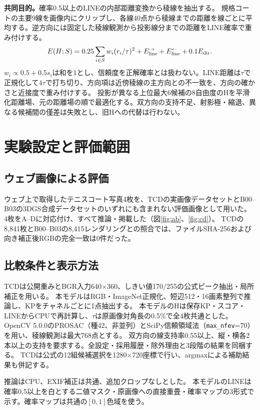 \documentclass[a4paper,10pt]{article}
\newcommand{\sect}[1]{\section{#1}\vspace{-1mm}}
\begin{document}
\textbf{共同目的。}確率0.5以上のLINEの内部距離変換から稜線を抽出する。
規格コートの主要9線を画像内にクリップし、各線40点から稜線までの距離を線ごとに平均する。逆方向には固定した稜線観測から投影線分までの距離をLINE確率で重み付けする。
\begin{equation}
E(H;S)=0.25\sum_{i\in S}w_i(r_i/\tau)^2+E_{\rm line}^{\rightarrow}+E_{\rm line}^{\leftarrow}+0.1E_{\rm dir}.
\end{equation}
$w_i\propto0.5+0.5s_i$は和を1とし、信頼度を正解確率とは扱わない。LINE距離は$\tau$で正規化して$4\tau$で打ち切り、方向項は近傍稜線の主方向との不一致を、方向の確かさと近接度で重み付けする。
投影が異なる上位最大6候補の8自由度のHを平滑化距離場、元の距離場の順で最適化する。双方向の支持不足、射影極・縮退、異なる候補間の僅差は失敗とし、旧Hへの代替は行わない。

\newpage
\sect{実験設定と評価範囲}
\subsection{ウェブ画像による評価}
ウェブ上で取得したテニスコート写真4枚を、TCDの実画像データセットとB00--B03の3DGS合成データセットのいずれにも含まれない評価画像として用いた。
4枚をA--Dに対応付け、すべて推論・掲載した（図\ref{fig:ab}、\ref{fig:cd}）。
TCDの8,841枚とB00--B03の8,415レンダリングとの照合では、ファイルSHA-256および向き補正後RGBの完全一致は0件だった。

\subsection{比較条件と表示方法}
TCDは公開重みとBGR入力640$\times$360、しきい値170/255の公式ピーク抽出・局所補正を用いる。
本モデルはRGB・ImageNet正規化、短辺512・16画素整列で推論し、KPをチャネルごとに1点抽出する。
本モデルのHは保存KP・スコア・LINEからCPUで再計算し、$\tau$は原画像対角長の0.5\%で全4枚共通とした。
OpenCV 5.0.0のPROSAC（種42、非並列）とSciPy信頼領域法（\texttt{max\_nfev}=70）を用い、稜線観測は最大768点とする。
双方向の線支持率0.55以上、縦・横各2本以上の支持を要求する。全設定・採用履歴・除外理由と3段階の結果を同梱する。
TCDは公式の12組候補選択を1280$\times$720座標で行い、argmaxによる補助結果も併記する。

推論はCPU、EXIF補正は共通、追加クロップなしとした。
本モデルのLINEは確率0.5以上を白とする二値マスク・原画像への直接重畳・確率マップの3形式で示す。確率マップは共通の$[0,1]$色域を使う。
\end{document}

